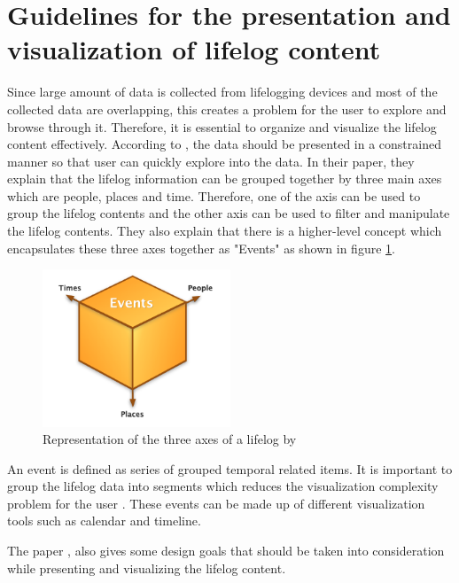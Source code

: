 \documentclass[mscthesis]{usiinfthesis}
\begin{document}
\section{Guidelines for the presentation and visualization of lifelog content}
\label{sec:guide}

Since large amount of data is collected from lifelogging devices and most of the collected data are overlapping, this creates a problem for the user to explore and browse through it. Therefore, it is essential to organize and visualize the lifelog content effectively. According to \citeauthor{byrne_guidelines_2008}, the data should be presented in a constrained manner so that user can quickly explore into the data. In their paper, they explain that the lifelog information can be grouped together by three main axes which are people, places and time. Therefore, one of the axis can be used to group the lifelog contents and the other axis can be used to filter and manipulate the lifelog contents. They also explain that there is a higher-level concept which encapsulates these three axes together as "Events" as shown in figure \ref{fig3}.

\begin{figure}[!ht]
  \centering
  \includegraphics[width=0.5\textwidth]{Events}
  \caption{Representation of the three axes of a lifelog by \citeauthor{byrne_guidelines_2008}}
  \label{fig3}
\end{figure}

An event is defined as series of grouped temporal related items. It is important to group the lifelog data into segments which reduces the visualization complexity problem for the user \citep{yang_visualizing_2013}. These events can be made up of different visualization tools such as calendar and timeline.
\linebreak

The paper \citep{byrne_guidelines_2008}, also gives some design goals that should be taken into consideration while presenting and visualizing the lifelog content.
\end{document}
